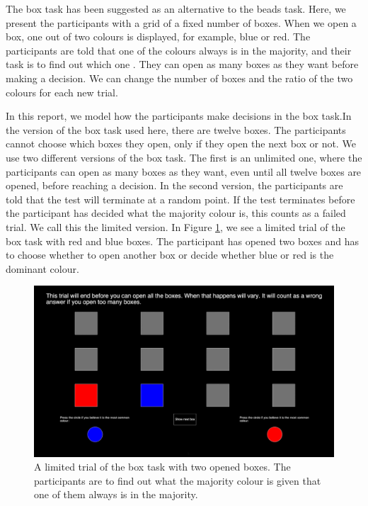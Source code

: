 The box task has been suggested as an alternative to the beads task. Here, we present the participants with a grid of a fixed number of boxes. When we open a box, one out of two colours is displayed, for example, blue or red. The participants are told that one of the colours always is in the majority, and their task is to find out which one \citep{moritz2017}. They can open as many boxes as they want before making a decision. We can change the number of boxes and the ratio of the two colours for each new trial. 

In this report, we model how the participants make decisions in the box task.In the version of the box task used here, there are twelve boxes.
The participants cannot choose which boxes they open, only if they open the next box or not. We use two different versions of the box task. The first is an unlimited one, where the participants can open as many boxes as they want, even until all twelve boxes are opened, before reaching a decision. In the second version, the participants are told that the test will terminate at a random point. If the test terminates before the participant has decided what the majority colour is, this counts as a failed trial. We call this the limited version. In Figure \ref{picture_of_box_task}, we see a limited trial of the box task with red and blue boxes. The participant has opened two boxes and has to choose whether to open another box or decide whether blue or red is the dominant colour. 
\begin{figure}
    \centering
    \includegraphics[scale=0.486]{Sections/Box task 2.png}
    \caption[A Limited Trial of the Box Task Visualised]{A limited trial of the box task with two opened boxes. The participants are to find out what the majority colour is given that one of them always is in the majority.}
    \label{picture_of_box_task}
\end{figure}


